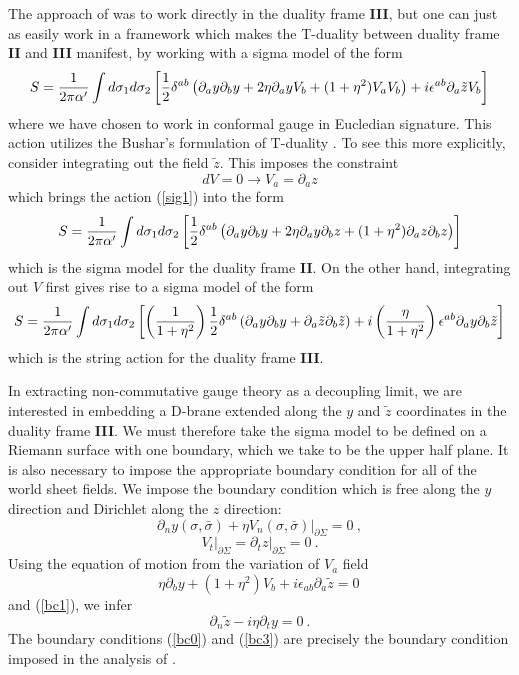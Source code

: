 \documentclass[12pt]{article}
\newcommand{\be}{\begin{equation}}
\newcommand{\ee}{\end{equation}}
\begin{document}
The approach of \cite{Seiberg:1999vs} was to work directly in the
duality frame {\bf III}, but one can just as easily work in a
framework which makes the T-duality between duality frame {\bf II}
and {\bf III} manifest, by working with a sigma model of the form 
%
\be S= {1 \over 2 \pi \alpha'} \int d \sigma_1  d \sigma_2 \left[{1 \over 2} \delta^{ab} \left( \partial_a y \partial_b y + 2 \eta \partial_a y V_b + (1 + \eta^2) V_a V_b\right) + i \epsilon^{ab} \partial_a \tilde z  V_b \right]\label{sig1}\ee
%
where we have chosen to work in conformal gauge in Eucledian
signature. This action utilizes the Bushar's formulation of T-duality
\cite{Buscher:1987qj}. To see this more explicitly, consider integrating out the field $\tilde z$. This imposes the constraint
%
\be d V = 0 \rightarrow V_a = \partial_a z \ee
%
which brings the action (\ref{sig1}) into the form
%
\be S= {1 \over 2 \pi \alpha'} \int d \sigma_1 d \sigma_2 \left[{1 \over 2} \delta^{ab} \left( \partial_a y \partial_b y + 2 \eta \partial_a y \partial_b z + (1 + \eta^2) \partial_a z \partial_b z \right)  \right]\label{sig2}\ee
%
which is the sigma model for the duality frame {\bf II}. On the other hand, integrating out $V$ first gives rise to a sigma model of the form
%
\be S= {1 \over 2 \pi \alpha'} \int d \sigma_1 d \sigma_2 \left[\left( {1 \over 1 + \eta^2}\right) {1 \over 2} \delta^{ab} \left( \partial_a y \partial_b y + \partial_a \tilde z \partial_b \tilde z \right)  + i \left({\eta \over 1 + \eta^2}\right)\epsilon^{ab} \partial_a y \partial_b \tilde z \right]\label{sig3}\ee
%
which is the string action for the duality frame {\bf III}.

In extracting non-commutative gauge theory as a decoupling limit, we
are interested in embedding a D-brane extended along the $y$ and
$\tilde z$ coordinates in the duality frame {\bf III}.  We must
therefore take the sigma model to be defined on a Riemann surface with
one boundary, which we take to be the upper half plane.  It is also
necessary to impose the appropriate boundary condition for all of the
world sheet fields. We impose the boundary condition which is free
along the $y$ direction and Dirichlet along the $z$ direction:
%
\be \left.\partial_n y(\sigma,\bar \sigma)+ \eta V_n(\sigma,\bar\sigma)\right|_{\partial \Sigma} = 0 \label{bc0} \ , \ee
\be \left. V_t \right|_{\partial \Sigma}  = \left. \partial_t z \right|_{\partial \Sigma} = 0 \label{bc1} \ . \ee
%
Using the equation of motion from the variation of $V_a$ field
%
\be \eta \partial_b y + (1 + \eta^2) V_b + i \epsilon_{ab} \partial_a \tilde z = 0 \, \label{bc2}\ee
%
and (\ref{bc1}), we infer 
%
\be  \partial_n \tilde z - i \eta \partial_t  y = 0 \label{bc3}\ .  \ee
%
The boundary conditions (\ref{bc0}) and (\ref{bc3}) are precisely the
boundary condition imposed in the analysis of \cite{Seiberg:1999vs}.
\end{document}
